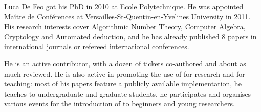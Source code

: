 \begin{participant}[PM=12,type=leadPI,gender=male]{Luca De Feo}
  got his PhD in 2010 at Ecole Polytechnique. He was appointed Maître de Conférences at
  Versailles-St-Quentin-en-Yvelines University in 2011. His research interests cover
  Algorithmic Number Theory, Computer Algebra, Cryptology and Automated deduction, and he
  has already published 8 papers in international journals or refereed international
  conferences.

  He is an active \Sage contributor, with a dozen of tickets co-authored and about as much
  reviewed. He is also active in promoting the use of \Sage for research and for teaching:
  most of his papers feature a publicly available \Sage implementation, he teaches \Sage to
  undergraduate and graduate students, he participates and organises various events for
  the introduction of \Sage to beginners and young researchers.
\end{participant}
